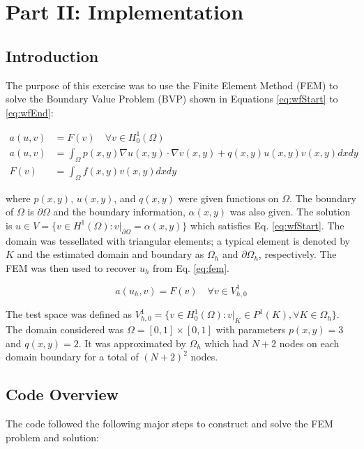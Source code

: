 \documentclass[a4paper, 12pt]{article}
\title{}
\begin{document}
\section*{Part II: Implementation} 
\subsection{Introduction}\label{sec:intro}
The purpose of this exercise was to use the Finite Element Method (FEM)
to solve the Boundary Value Problem (BVP) shown in Equations \ref{eq:wfStart}
to \ref{eq:wfEnd}:


\begin{align}
a( u, v) &= F(v) \quad \forall v \in H_0^1(\Omega) \label{eq:wfStart} \\
a( u, v) &= \int_{\Omega} p( x, y) \nabla u( x, y)  \cdot \nabla v( x, y) + q( x, y) u( x, y) v( x, y) dx dy \\
F(v)     &= \int_{\Omega} f( x, y) v( x, y) dxdy \label{eq:wfEnd}
\end{align}

\noindent
where $p(x,y)$, $u(x,y)$, and $q(x,y)$ were given functions on $\Omega$.
The boundary of $\Omega$ is $\partial \Omega$ and the boundary
information, $\alpha( x, y)$ was also given.
The solution is $u \in V = \{ v\in H^1(\Omega):v\rvert_{\partial \Omega} = \alpha( x, y)\}$
which satisfies Eq. \ref{eq:wfStart}. 
The domain was tessellated with triangular elements;
a typical element is denoted by $K$ and the estimated 
domain and boundary as $\Omega_h$ and $\partial \Omega_h$, respectively.
The FEM was then used to recover $u_h$ from Eq. \ref{eq:fem}.

\begin{equation}
a( u_h, v) = F( v) \quad \forall v \in V_{h,0}^1  \label{eq:fem}
\end{equation}

\noindent
The test space was defined as
$V_{h,0}^1 = \{v \in H_0^1(\Omega): v\rvert_{K} \in P^1(K), \forall K \in \Omega_h\}$.
The domain considered was $\Omega = [0, 1] \times [0,1]$ with 
parameters $p(x,y) = 3$ and $q(x,y) = 2$.
It was approximated by $\Omega_h$ which had $N+2$ nodes
on each domain boundary for a total of $(N+2)^2$ nodes.

\subsection{Code Overview} \label{ss:codeOverview}
The code followed the following major steps to 
construct and solve the FEM problem and solution:
\end{document}
